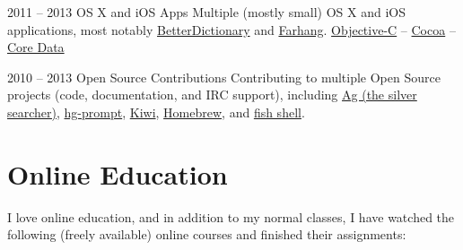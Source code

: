 \documentclass{tccv}
\begin{document}
\begin{project_list}
	 
	 
\item{2011 -- 2013}
	 {}
	 {OS X and iOS Apps}
	 {Multiple (mostly small) OS X and iOS applications, most notably \href{http://pooriaazimi.github.io/BetterDictionary/}{BetterDictionary} and \href{http://www.turnedondigital.com/?portfolio=farhang-iphone-app}{Farhang}.}
	 {
	 	\href{https://en.wikipedia.org/wiki/Objective-C}{Objective-C} -- 
		\href{https://en.wikipedia.org/wiki/Cocoa_(API)}{Cocoa} -- 
		\href{https://en.wikipedia.org/wiki/Core_Data}{Core Data}
	 }
	 


\item{2010 -- 2013}
	 {}
	 {Open Source Contributions}
	 {Contributing to multiple Open Source projects (code, documentation, and IRC support), including 
	 \href{https://github.com/ggreer/the_silver_searcher}{Ag (the silver searcher)}, 
	 \href{http://bitbucket.org/sjl/hg-prompt/}{hg-prompt}, \href{https://github.com/allending/Kiwi}{Kiwi}, 
	 \href{https://github.com/mxcl/homebrew}{Homebrew}, and 
	 \href{http://fishshell.com}{fish shell}.}
	 {}


\end{project_list}







\section{Online Education}

I love online education, and in addition to my normal classes, I have watched the following (freely available) online courses and finished their assignments:
\end{document}
